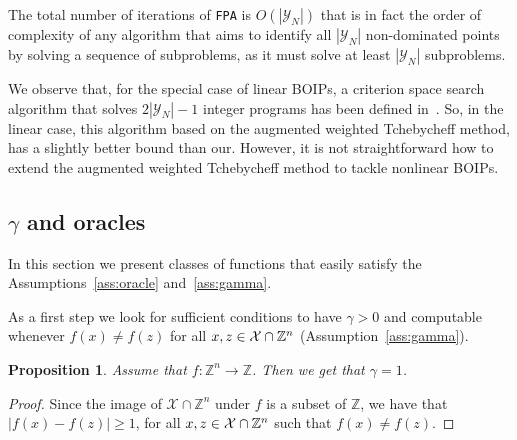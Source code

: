 \documentclass[preprint,12pt]{elsarticle}
\newtheorem{proposition}[theorem]{Proposition}
\def\X{{\cal X}}
\def\Z{\mathbb{Z}}
\begin{document}
The total number of iterations of \texttt{FPA} is $O(|\mathcal{Y}_N|)$ that is in fact the order of complexity of any algorithm
 that aims to identify all
$|\mathcal{Y}_N|$ non-dominated points by solving a sequence of subproblems, as it must solve at least
$|\mathcal{Y}_N|$ subproblems.

We observe that, for the special case of linear BOIPs, a criterion space search algorithm
that solves $2|\mathcal{Y}_N|-1$ integer programs has been defined in~\cite{ralphs2006improved}.
So, in the linear case, this algorithm based on the augmented weighted Tchebycheff method, has a slightly better bound than our.
However, it is not straightforward how to extend the augmented weighted Tchebycheff method to tackle nonlinear BOIPs.

\subsection{$\gamma$ and oracles}
In this section we present classes of functions that easily satisfy the Assumptions~\ref{ass:oracle} and~\ref{ass:gamma}.


As a first step we look for sufficient conditions to have $\gamma>0$ and computable whenever $f(x)\neq f(z)$ for all $x,z \in \X\cap \Z^n$ (Assumption~\ref{ass:gamma}).
\begin{proposition}\label{prop:suffcond}
Assume that $f:\Z^n\rightarrow \Z$. Then we get that $\gamma = 1$.
\end{proposition}
\begin{proof}
Since the image of $\mathcal{X}\cap \Z^n$ under $f$ is a subset of $\Z$, we have that $ |f(x) - f(z)| \ge 1$, for all $x,z \in \X\cap \Z^n$ such that $f(x) \neq f(z)$.
\end{proof}
\end{document}

